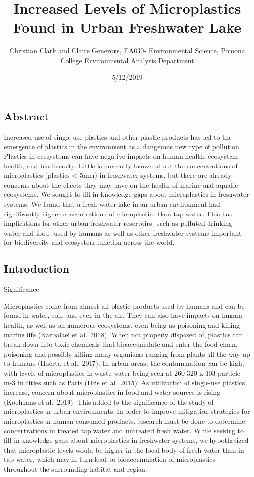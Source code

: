 \documentclass[]{article}
\title{Increased Levels of Microplastics Found in Urban Freshwater Lake}
\author{Christian Clark and Claire Generous, EA030- Environmental Science,
Pomona College Environmental Analysis Department}
\date{5/12/2019}
\begin{document}
\maketitle

\hypertarget{abstract}{%
\subsection{Abstract}\label{abstract}}

Increased use of single use plastics and other plastic products has led
to the emergence of plastics in the environment as a dangerous new type
of pollution. Plastics in ecosystems can have negative impacts on human
health, ecosystem health, and biodiversity. Little is currently known
about the concentrations of microplastics (plastics \textless{} 5mm) in
freshwater systems, but there are already concerns about the effects
they may have on the health of marine and aquatic ecosystems. We sought
to fill in knowledge gaps about microplastics in freshwater systems. We
found that a fresh water lake in an urban environment had significantly
higher concentrations of microplastics than tap water. This has
implications for other urban freshwater reservoirs- such as polluted
drinking water and food- used by humans as well as other freshwater
systems important for biodiversity and ecosystem function across the
world.

\hypertarget{introduction}{%
\subsection{Introduction}\label{introduction}}

Significance

Microplastics come from almost all plastic products used by humans and
can be found in water, soil, and even in the air. They can also have
impacts on human health, as well as on numerous ecosystems, even being
as poisoning and killing marine life (Karbalaei et al.~2018). When not
properly disposed of, plastics can break down into toxic chemicals that
bioaccumulate and enter the food chain, poisoning and possibly killing
many organisms ranging from plants all the way up to humans (Huerta et
al.~2017). In urban areas, the contamination can be high, with levels of
microplastics in waste water being seen at 260-320 x 103 particle m-3 in
cities such as Paris (Dris et al.~2015). As utilization of single-use
plastics increase, concern about microplastics in food and water sources
is rising (Koelmans et al.~2019). This added to the significance of the
study of microplastics in urban environments. In order to improve
mitigation strategies for microplastics in human-consumed products,
research must be done to determine concentrations in treated tap water
and untreated fresh water. While seeking to fill in knowledge gaps about
microplastics in freshwater systems, we hypothesized that microplastic
levels would be higher in the local body of fresh water than in tap
water, which may in turn lead to bioaccumulation of microplastics
throughout the surrounding habitat and region.
\end{document}
